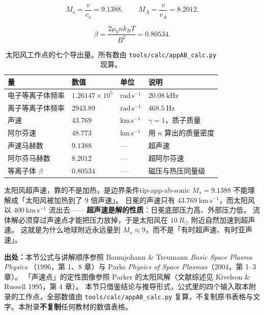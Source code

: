 \begin{equation}
M_s=\frac{v}{c_s}=9.1388,\qquad M_A=\frac{v}{v_A}=8.2012 .
\label{eq:app-ab-ms}
\end{equation}

\begin{equation}
\beta=\frac{2\mu_0 n k_BT}{B^2}=0.80534 .
\label{eq:app-ab-beta}
\end{equation}

\begin{table}[htbp]
\centering
\small
\caption{太阳风工作点的七个导出量。所有数由 \texttt{tools/\allowbreak{}calc/\allowbreak{}appAB\_calc.py} 现算。}
\label{tab:app-ab-solarwind}
\begin{tabular}{p{3.4cm}p{3.0cm}p{3.0cm}p{4.0cm}}
\toprule
量 & 数值 & 单位 & 说明 \\
\midrule
电子等离子体频率 & $1.26147\times10^{5}$ & $\mathrm{rad\,s^{-1}}$ & $20.08\ \mathrm{kHz}$ \\
离子等离子体频率 & $2943.89$ & $\mathrm{rad\,s^{-1}}$ & $468.5\ \mathrm{Hz}$ \\
声速 & $43.769$ & $\mathrm{km\,s^{-1}}$ & $\gamma=1$，质子质量 \\
阿尔芬速 & $48.773$ & $\mathrm{km\,s^{-1}}$ & 用 $n$ 算出的质量密度 \\
声速马赫数 & $9.1388$ & --- & 超声速 \\
阿尔芬马赫数 & $8.2012$ & --- & 超阿尔芬速 \\
等离子体 $\beta$ & $0.80534$ & --- & 磁压与热压同量级 \\
\bottomrule
\end{tabular}

\end{table}

\begin{tip}{太阳风超声速，靠的不是加热，是边界条件}{tip-app-ab-sonic}
$M_s=9.1388$ 不能理解成「太阳风被加热到了 9 倍声速」。
日冕的声速只有 $43.769\ \mathrm{km\,s^{-1}}$，而太阳风以 $400\ \mathrm{km\,s^{-1}}$ 流出去——
\textbf{超声速是解的性质}：日冕底部压力高、外部压力低，
流体解必须穿过声速点才能把压力放掉，于是太阳风在 $10\ R_\odot$ 附近自然加速到超声速。
这就是为什么地球附近永远量到 $M_s\approx9$，而不是「有时超声速、有时亚声速」。
\end{tip}

{\footnotesize
\textbf{出处：}本节公式与讲解顺序参照 Baumjohann \& Treumann \emph{Basic Space Plasma Physics}
（1996，第 1、8 章）与 Parks \emph{Physics of Space Plasmas}（2004，第 1--3 章）。
「声速点」的定性图像参照 Parker 的太阳风解（文献综述见 Kivelson \& Russell 1995，第 4 章）。
本节只借鉴结论与推导形式，公式里的四个输入取本附录的工作点，全部数值由
\texttt{tools/\allowbreak{}calc/\allowbreak{}appAB\_calc.py} 复算，不复制原书表格与文字。本附录\textbf{不复制}任何教材的数值表格。
}

